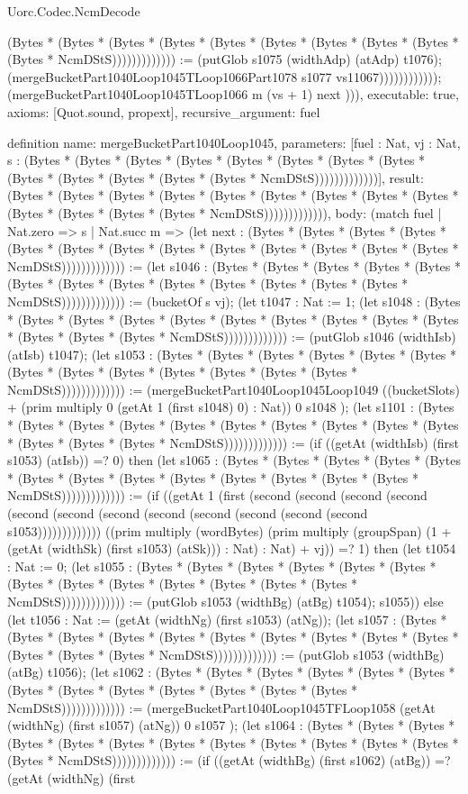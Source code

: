 \begin{lexlean}{Uorc.Codec.NcmDecode}
\begin{semanticmodule}
{(Bytes * (Bytes * (Bytes * (Bytes * (Bytes * (Bytes * (Bytes * (Bytes * (Bytes * (Bytes * NcmDStS))))))))))))) := (putGlob s1075 (widthAdp) (atAdp) t1076); (mergeBucketPart1040Loop1045TLoop1066Part1078 s1077 vs11067)))))))))))); (mergeBucketPart1040Loop1045TLoop1066 m (vs + 1) next ))),
  executable: true,
  axioms: [Quot.sound, propext],
  recursive_argument: fuel
}

definition{
  name: mergeBucketPart1040Loop1045,
  parameters: [fuel : Nat, vj : Nat, s : (Bytes * (Bytes * (Bytes * (Bytes * (Bytes * (Bytes * (Bytes * (Bytes * (Bytes * (Bytes * (Bytes * (Bytes * (Bytes * NcmDStS)))))))))))))],
  result: (Bytes * (Bytes * (Bytes * (Bytes * (Bytes * (Bytes * (Bytes * (Bytes * (Bytes * (Bytes * (Bytes * (Bytes * (Bytes * NcmDStS))))))))))))),
  body: (match fuel
    | Nat.zero => s
    | Nat.succ m => (let next : (Bytes * (Bytes * (Bytes * (Bytes * (Bytes * (Bytes * (Bytes * (Bytes * (Bytes * (Bytes * (Bytes * (Bytes * (Bytes * NcmDStS))))))))))))) := (let s1046 : (Bytes * (Bytes * (Bytes * (Bytes * (Bytes * (Bytes * (Bytes * (Bytes * (Bytes * (Bytes * (Bytes * (Bytes * (Bytes * NcmDStS))))))))))))) := (bucketOf s vj); (let t1047 : Nat := 1; (let s1048 : (Bytes * (Bytes * (Bytes * (Bytes * (Bytes * (Bytes * (Bytes * (Bytes * (Bytes * (Bytes * (Bytes * (Bytes * (Bytes * NcmDStS))))))))))))) := (putGlob s1046 (widthIsb) (atIsb) t1047); (let s1053 : (Bytes * (Bytes * (Bytes * (Bytes * (Bytes * (Bytes * (Bytes * (Bytes * (Bytes * (Bytes * (Bytes * (Bytes * (Bytes * NcmDStS))))))))))))) := (mergeBucketPart1040Loop1045Loop1049 ((bucketSlots) + (prim multiply 0 (getAt 1 (first s1048) 0) : Nat)) 0 s1048 ); (let s1101 : (Bytes * (Bytes * (Bytes * (Bytes * (Bytes * (Bytes * (Bytes * (Bytes * (Bytes * (Bytes * (Bytes * (Bytes * (Bytes * NcmDStS))))))))))))) := (if ((getAt (widthIsb) (first s1053) (atIsb)) =? 0) then (let s1065 : (Bytes * (Bytes * (Bytes * (Bytes * (Bytes * (Bytes * (Bytes * (Bytes * (Bytes * (Bytes * (Bytes * (Bytes * (Bytes * NcmDStS))))))))))))) := (if ((getAt 1 (first (second (second (second (second (second (second (second (second (second (second (second (second s1053))))))))))))) ((prim multiply (wordBytes) (prim multiply (groupSpan) (1 + (getAt (widthSk) (first s1053) (atSk))) : Nat) : Nat) + vj)) =? 1) then (let t1054 : Nat := 0; (let s1055 : (Bytes * (Bytes * (Bytes * (Bytes * (Bytes * (Bytes * (Bytes * (Bytes * (Bytes * (Bytes * (Bytes * (Bytes * (Bytes * NcmDStS))))))))))))) := (putGlob s1053 (widthBg) (atBg) t1054); s1055)) else (let t1056 : Nat := (getAt (widthNg) (first s1053) (atNg)); (let s1057 : (Bytes * (Bytes * (Bytes * (Bytes * (Bytes * (Bytes * (Bytes * (Bytes * (Bytes * (Bytes * (Bytes * (Bytes * (Bytes * NcmDStS))))))))))))) := (putGlob s1053 (widthBg) (atBg) t1056); (let s1062 : (Bytes * (Bytes * (Bytes * (Bytes * (Bytes * (Bytes * (Bytes * (Bytes * (Bytes * (Bytes * (Bytes * (Bytes * (Bytes * NcmDStS))))))))))))) := (mergeBucketPart1040Loop1045TFLoop1058 (getAt (widthNg) (first s1057) (atNg)) 0 s1057 ); (let s1064 : (Bytes * (Bytes * (Bytes * (Bytes * (Bytes * (Bytes * (Bytes * (Bytes * (Bytes * (Bytes * (Bytes * (Bytes * (Bytes * NcmDStS))))))))))))) := (if ((getAt (widthBg) (first s1062) (atBg)) =? (getAt (widthNg) (first }
\end{semanticmodule}
\end{lexlean}
